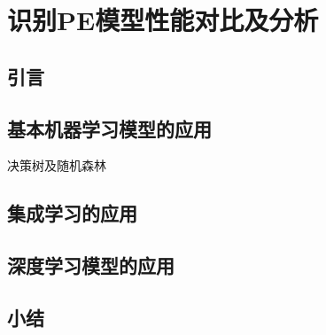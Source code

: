 \chapter{识别PE模型性能对比及分析}
\section{引言}
\section{基本机器学习模型的应用}
决策树及随机森林
\section{集成学习的应用}
\section{深度学习模型的应用}
\section{小结}
